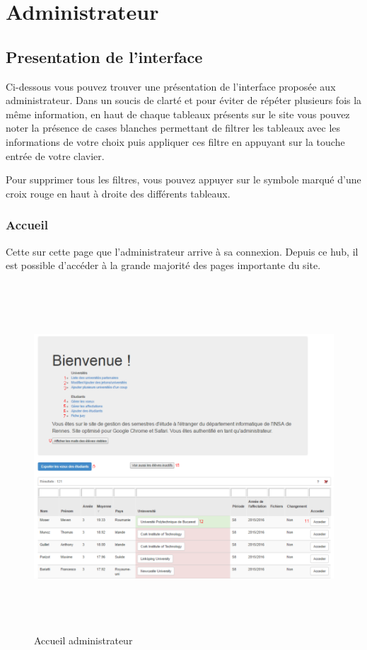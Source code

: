 \chapter{Administrateur}
\label{admin}

\section{Presentation de l'interface}
Ci-dessous vous pouvez trouver une présentation de l'interface proposée aux administrateur. Dans un soucis de clarté et pour éviter de répéter plusieurs fois la même information, en haut de chaque tableaux présents sur le site vous pouvez noter la présence de cases blanches permettant de filtrer les tableaux avec les informations de votre choix puis appliquer ces filtre en appuyant sur la touche entrée de votre clavier.

Pour supprimer tous les filtres, vous pouvez appuyer sur le symbole marqué d'une croix rouge en haut à droite des différents tableaux.

 
\subsection{Accueil}
\label{aa}
Cette sur cette page que l'administrateur arrive à sa connexion. Depuis ce hub, il est possible d'accéder à la grande majorité des pages importante du site.
 \begin{figure}[H]
 	\centering
 	
 	\includegraphics[width=16cm,height=13cm]{Images/Admin/menu_acceuil_admin.png}
 	\caption{Accueil administrateur}
 	
 \end{figure}
 
